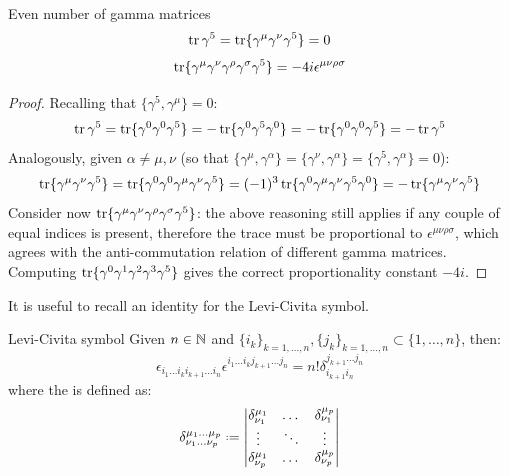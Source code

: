 \begin{proposition}[before upper = {\tcbtitle}]{Even number of gamma matrices}{}
  \begin{equation}
    \operatorname{tr} \gamma^5 = \operatorname{tr}\{\gamma^\mu \gamma^\nu \gamma^5\} = 0
  \end{equation}
  \begin{equation}
    \operatorname{tr}\{\gamma^\mu \gamma^\nu \gamma^\rho \gamma^\sigma \gamma^5\} = -4i \epsilon^{\mu \nu \rho \sigma}
  \end{equation}
\end{proposition}

\begin{proofbox}
  \begin{proof}
    Recalling that $ \{\gamma^5 , \gamma^\mu\} = 0 $:
    \begin{equation*}
      \operatorname{tr} \gamma^5 = \operatorname{tr}\{\gamma^0 \gamma^0 \gamma^5\} = - \operatorname{tr}\{\gamma^0 \gamma^5 \gamma^0\} = - \operatorname{tr}\{\gamma^0 \gamma^0 \gamma^5\} = - \operatorname{tr} \gamma^5
    \end{equation*}
    Analogously, given $ \alpha \neq \mu , \nu $ (so that $ \{\gamma^\mu , \gamma^\alpha\} = \{\gamma^\nu , \gamma^\alpha\} = \{\gamma^5 , \gamma^\alpha\} = 0 $):
    \begin{equation*}
      \operatorname{tr}\{\gamma^\mu \gamma^\nu \gamma^5\} = \operatorname{tr}\{\gamma^0 \gamma^0 \gamma^\mu \gamma^\nu \gamma^5\} = (-1)^3 \operatorname{tr}\{\gamma^0 \gamma^\mu \gamma^\nu \gamma^5 \gamma^0\} = - \operatorname{tr}\{\gamma^\mu \gamma^\nu \gamma^5\}
    \end{equation*}
    Consider now $ \operatorname{tr}\{\gamma^\mu \gamma^\nu \gamma^\rho \gamma^\sigma \gamma^5\} $: the above reasoning still applies if any couple of equal indices is present, therefore the trace must be proportional to $ \epsilon^{\mu \nu \rho \sigma} $, which agrees with the anti-commutation relation of different gamma matrices. Computing $ \operatorname{tr}\{\gamma^0 \gamma^1 \gamma^2 \gamma^3 \gamma^5\} $ gives the correct proportionality constant $ -4i $.
  \end{proof}
\end{proofbox}

It is useful to recall an identity for the Levi-Civita symbol.

\begin{lemma}{Levi-Civita symbol}{}
  Given $ n \in \mathbb{N} $ and $ \{i_k\}_{k = 1,\dots,n} , \{j_k\}_{k = 1,\dots,n} \subset \{1,\dots,n\} $, then:
  \begin{equation}
    \epsilon_{i_1 \dots i_k i_{k+1} \dots i_n} \epsilon^{i_1 \dots i_k j_{k+1} \dots j_n} = n! \delta^{j_{k+1} \dots j_n}_{i_{k+1} i_n}
  \end{equation}
  where the  is defined as:
  \begin{equation}
    \delta^{\mu_1 \dots \mu_p}_{\nu_1 \dots \nu_p} \defeq
    \begin{vmatrix}
      \delta^{\mu_1}_{\nu_1} & \dots & \delta^{\mu_p}_{\nu_1} \\
      \vdots & \ddots & \vdots \\
      \delta^{\mu_1}_{\nu_p} & \dots & \delta^{\mu_p}_{\nu_p}
    \end{vmatrix}
  \end{equation}
\end{lemma}

